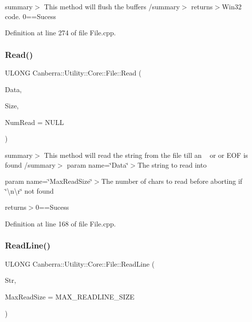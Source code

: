 summary$>$ This method will flush the buffers /summary$>$ returns$>$Win32 code. 0==Sucess

Definition at line 274 of file File.\+cpp.

\mbox{\label{class_canberra_1_1_utility_1_1_core_1_1_file_a18578796ff3634bd07d90d22ffb82b7d_a18578796ff3634bd07d90d22ffb82b7d}} 
\subsubsection{\texorpdfstring{Read()}{Read()}}
{\footnotesize\ttfamily U\+L\+O\+NG Canberra\+::\+Utility\+::\+Core\+::\+File\+::\+Read (\begin{DoxyParamCaption}\item[{void $\ast$}]{Data,  }\item[{L\+O\+NG}]{Size,  }\item[{L\+O\+NG $\ast$}]{Num\+Read = {\ttfamily NULL} }\end{DoxyParamCaption})}

summary$>$ This method will read the string from the file till an \textquotesingle{}~\newline
\textquotesingle{} or \textquotesingle{}\textquotesingle{} or E\+OF is found /summary$>$ param name=\char`\"{}\+Data\char`\"{}$>$The string to read into

param name=\char`\"{}\+Max\+Read\+Size\char`\"{}$>$The number of chars to read before aborting if \char`\"{}\textbackslash{}n\textbackslash{}r\char`\"{} not found

returns$>$0==Sucess

Definition at line 168 of file File.\+cpp.

\mbox{\label{class_canberra_1_1_utility_1_1_core_1_1_file_a13bb46328a3166eba497652b6d7d25a9_a13bb46328a3166eba497652b6d7d25a9}} 
\subsubsection{\texorpdfstring{Read\+Line()}{ReadLine()}}
{\footnotesize\ttfamily U\+L\+O\+NG Canberra\+::\+Utility\+::\+Core\+::\+File\+::\+Read\+Line (\begin{DoxyParamCaption}\item[{\hyperlink{class_canberra_1_1_utility_1_1_core_1_1_string}{String} \&}]{Str,  }\item[{U\+L\+O\+NG}]{Max\+Read\+Size = {\ttfamily MAX\+\_\+READLINE\+\_\+SIZE} }\end{DoxyParamCaption})}

